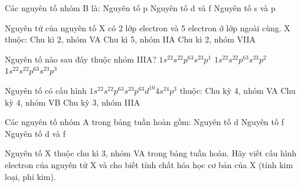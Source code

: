 \begin{ex}[1 điểm]
	Các nguyên tố nhóm B là:
	{Nguyên tố p}
	{\True Nguyên tố d và f}
	{Nguyên tố s và p}
\end{ex}


\begin{ex}[1 điểm]
	Nguyên tử của nguyên tố X có 2 lớp electron và 5 electron ở lớp ngoài cùng. X thuộc:
	{\True Chu kì 2, nhóm VA}
	{Chu kì 5, nhóm IIA}
	{Chu kì 2, nhóm VIIA}
\end{ex}


\begin{ex}[1 điểm]
	Nguyên tố nào sau đây thuộc nhóm IIIA?
	{\True $1s^22s^22p^63s^23p^1$}
	{$1s^22s^22p^63s^23p^2$}
	{$1s^22s^22p^63s^23p^3$}
\end{ex}


\begin{ex}[1 điểm]
	Nguyên tố có cấu hình $1s^22s^22p^63s^23p^63d^{10}4s^24p^3$ thuộc:
	{\True Chu kỳ 4, nhóm VA}
	{Chu kỳ 4, nhóm VB}
	{Chu kỳ 3, nhóm IIIA}
\end{ex}


\begin{ex}[1 điểm]
	Các nguyên tố nhóm A trong bảng tuần hoàn gồm:
	{Nguyên tố d}
	{Nguyên tố f}
	{Nguyên tố d và f}
\end{ex}


\begin{bt}[1 điểm]
    Nguyên tố X thuộc chu kì 3, nhóm VA trong bảng tuần hoàn. Hãy viết cấu hình electron của nguyên tử X và cho biết tính chất hóa học cơ bản của X (tính kim loại, phi kim).
\end{bt}


